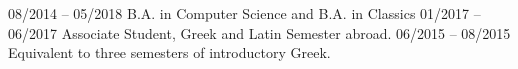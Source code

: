 
\begin{entrylist}
	\entry
		{08/2014 -- 05/2018}
   		{B.A. in Computer Science and B.A. in Classics}
		{\grinnell}
		{}
	\entry
		{01/2017 -- 06/2017}
    		{Associate Student, Greek and Latin}
    		{\ucl}
    		{Semester abroad.}
	\entry
		{06/2015 -- 08/2015}
    		{}
    		{\berkeley}
   		{Equivalent to three semesters of introductory Greek. %
   		}
\end{entrylist}